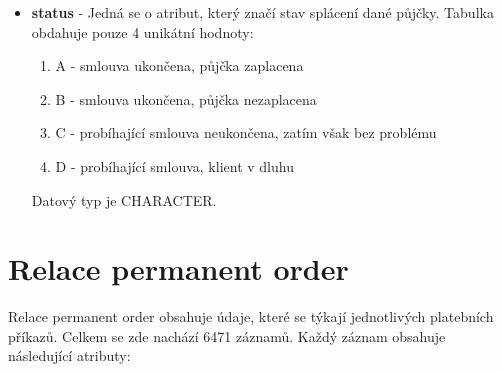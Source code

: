 \documentclass{article}
\begin{document}
\begin{itemize}
	
	\item \textbf{status} - Jedná se o atribut, který značí stav splácení dané půjčky. Tabulka obdahuje pouze 4 unikátní hodnoty:
	\begin{enumerate}
        \item A	- smlouva ukončena, půjčka zaplacena
		\item B - smlouva ukončena, půjčka nezaplacena
		\item C	- probíhající smlouva neukončena, zatím však bez problému
		\item D	- probíhající smlouva, klient v dluhu
    \end{enumerate}
    Datový typ je CHARACTER.
    
\end{itemize}

\section{Relace permanent order}

Relace permanent order obsahuje údaje, které se týkají jednotlivých platebních příkazů. Celkem se zde nachází 6471 záznamů. Každý záznam obsahuje následující atributy:
\end{document}
